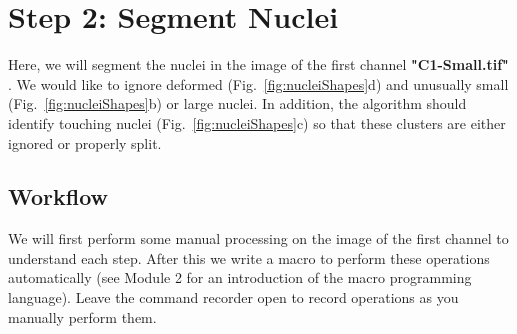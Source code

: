 \section{Step 2: Segment Nuclei}

Here, we will segment the nuclei in the image of the first channel \textbf{"C1-Small.tif"} . We would like to ignore deformed (Fig.~\ref{fig:nucleiShapes}d) and unusually small (Fig.~\ref{fig:nucleiShapes}b) or large nuclei. In addition, the algorithm should identify touching nuclei (Fig.~\ref{fig:nucleiShapes}c) so that these clusters are either ignored or properly split.

\subsection{Workflow}

We will first perform some manual processing on the image of the first channel to understand each step. After this we write a macro to perform these operations automatically (see Module 2 for an introduction of the macro programming language). Leave the command recorder open to record operations as you manually perform them.

